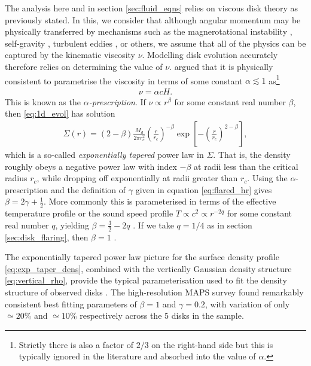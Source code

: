 The analysis here and in section \ref{sec:fluid_eqns} relies on viscous disk theory as previously stated.
In this, we consider that although angular momentum may be physically transferred by mechanisms such as the magnerotational instability \citep{sano2000}, self-gravity \citep{kratter2016}, turbulent eddies \citep{klahr2003}, or others, we assume that all of the physics can be captured by the kinematic viscosity $\nu$.
Modelling disk evolution accurately therefore relies on determining the value of $\nu$.
\citet{shakura1973} argued that it is physically consistent to parametrise the viscosity in terms of some constant $\alpha \lesssim 1$ as\footnote{Strictly there is also a factor of $2/3$ on the right-hand side but this is typically ignored in the literature and absorbed into the value of $\alpha$.}
\begin{align}
    \nu = \alpha c H.
\end{align}
This is known as the $\alpha$\textit{-prescription}. If $\nu \propto r^\beta$ for some constant real number $\beta$, then \ref{eq:1d_evol} has solution \citep{lynden-bell1974}
\begin{align}
    \Sigma(r) = (2 - \beta) \frac{M_d}{2 \pi r_c^2} \left( \frac{r}{r_c} \right)^{-\beta} \exp{\left[ - \left(\frac{r}{r_c}\right)^{2-\beta} \right]}, \label{eq:exp_taper_dens}
\end{align}
which is a so-called \textit{exponentially tapered} power law in $\Sigma$.
That is, the density roughly obeys a negative power law with index $-\beta$ at radii less than the critical radius $r_c$, while dropping off exponentially at radii greater than $r_c$.
Using the $\alpha$-prescription and the definition of $\gamma$ given in equation \ref{eq:flared_hr} gives $\beta=2\gamma+\frac{1}{2}$.
More commonly this is parameterised in terms of the effective temperature profile or the sound speed profile $T \propto c^2 \propto r^{-2q}$ for some constant real number $q$, yielding $\beta = \frac{3}{2} - 2q$ \citep{hartmann1998}.
If we take $q=1/4$ as in section \ref{sec:disk_flaring}, then $\beta=1$ \citep{chiang1997}.

The exponentially tapered power law picture for the surface density profile \ref{eq:exp_taper_dens}, combined with the vertically Gaussian density structure \ref{eq:vertical_rho}, provide the typical parameterisation used to fit the density structure of observed disks \citep{andrews2011,zhang2021}.
The high-resolution MAPS survey found remarkably consistent best fitting parameters of $\beta=1$ and $\gamma=0.2$, with variation of only $\simeq20$\% and $\simeq10$\% respectively across the 5 disks in the sample.


